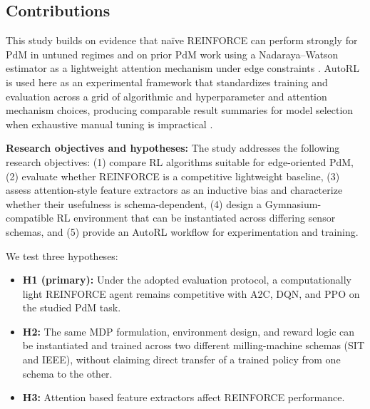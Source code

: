 \documentclass[sn-basic]{sn-jnl} %
\begin{document}
\subsection{Contributions}

This study builds on evidence that na\"{i}ve \textsc{REINFORCE} can perform strongly for PdM in untuned regimes \cite{Siraskar2025} and on prior PdM work using a Nadaraya--Watson estimator as a lightweight attention mechanism under edge constraints \cite{Siraskar2024}. AutoRL is used here as an experimental framework that standardizes training and evaluation across a grid of algorithmic and hyperparameter and attention mechanism choices, producing comparable result summaries for model selection when exhaustive manual tuning is impractical \cite{Schwartz2020, Strubell2019, Faust2019, Mussi2022}.

\textbf{Research objectives and hypotheses:}
The study addresses the following research objectives: (1) compare RL algorithms suitable for edge-oriented PdM, (2) evaluate whether \textsc{REINFORCE} is a competitive lightweight baseline, (3) assess attention-style feature extractors as an inductive bias and characterize whether their usefulness is schema-dependent, (4) design a Gymnasium-compatible RL environment that can be instantiated across differing sensor schemas, and (5) provide an AutoRL workflow for experimentation and training.

We test three hypotheses:
\begin{itemize}
    \item \textbf{H1 (primary):} Under the adopted evaluation protocol, a computationally light \textsc{REINFORCE} agent remains competitive with \textsc{A2C}, \textsc{DQN}, and \textsc{PPO} on the studied PdM task.
    \item \textbf{H2:} The same MDP formulation, environment design, and reward logic can be instantiated and trained across two different milling-machine schemas (SIT and IEEE), without claiming direct transfer of a trained policy from one schema to the other.
    \item \textbf{H3:} Attention based feature extractors affect \textsc{REINFORCE} performance.
\end{itemize}
\end{document}
